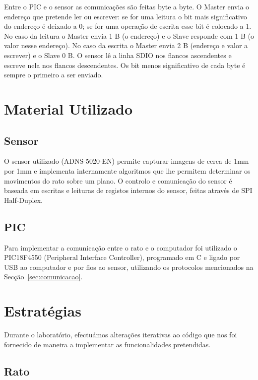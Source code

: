 \documentclass[a4paper]{article}
\begin{document}
Entre o PIC e o sensor as comunicações são feitas byte a byte. O Master envia o endereço que pretende ler ou escrever: se for uma leitura o bit mais significativo do endereço é deixado a 0; se for uma operação de escrita esse bit é colocado a 1. No caso da leitura o Master envia 1 B (o endereço) e o Slave responde com 1 B (o valor nesse endereço). No caso da escrita o Master envia 2 B (endereço e valor a escrever) e o Slave 0 B. O sensor lê a linha SDIO nos flancos ascendentes e escreve nela nos flancos descendentes. Os bit menos significativo de cada byte é sempre o primeiro a ser enviado.

\section{Material Utilizado}
\subsection{Sensor}
O sensor utilizado (ADNS-5020-EN) permite capturar imagens de cerca de 1mm por 1mm e implementa internamente algoritmos que lhe permitem determinar os movimentos do rato sobre um plano. O controlo e comunicação do sensor é baseada em escritas e leituras de registos internos do sensor, feitas através de SPI Half-Duplex.

\subsection{PIC}
Para implementar a comunicação entre o rato e o computador foi utilizado o PIC18F4550 (Peripheral Interface Controller), programado em C e ligado por USB ao computador e por fios ao sensor, utilizando os protocolos mencionados na Secção~\ref{sec:comunicacao}.

\section{Estratégias}
Durante o laboratório, efectuámos alterações iterativas ao código que nos foi fornecido de maneira a implementar as funcionalidades pretendidas.

\subsection{Rato}
\end{document}
